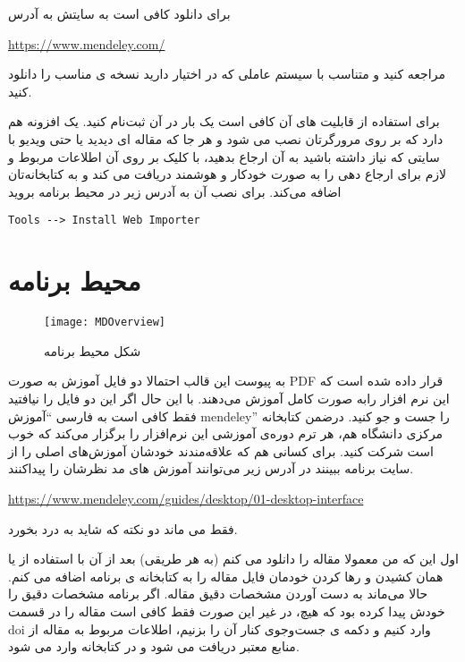 برای دانلود 
کافی است  به سایتش به آدرس 
\begin{latin}
	\url{https://www.mendeley.com/}
\end{latin}
مراجعه کنید و متناسب با سیستم عاملی که در اختیار دارید نسخه ی مناسب را دانلود کنید. 

برای استفاده از قابلیت های آن کافی است یک بار  در آن ثبت‌نام کنید.
یک افزونه هم دارد که بر روی مرورگرتان نصب می شود و هر جا که مقاله ای دیدید یا حتی ویدیو با سایتی که نیاز داشته باشید به آن ارجاع بدهید، با کلیک بر روی آن اطلاعات مربوط و لازم برای ارجاع دهی را به صورت خودکار و هوشمند دریافت می کند و به کتابخانه‌تان اضافه می‌کند.
برای نصب آن به آدرس زیر در محیط برنامه بروید 
\begin{latin}
	\begin{lstlisting}[style=Tex]
Tools --> Install Web Importer
	\end{lstlisting}
\end{latin}
\section{محیط برنامه }
\begin{figure}[h]
\centering
\texttt{[image: MDOverview]}
\caption{شکل محیط برنامه}
\label{fig:MDOverview}
\end{figure}
به پیوست این قالب احتمالا دو فایل آموزش به صورت PDF قرار داده شده است که این نرم افزار رابه صورت کامل آموزش می‌دهند. با این حال اگر این دو فایل را نیافتید فقط کافی است به فارسی ``آموزش mendeley'' را جست و جو کنید. درضمن کتابخانه مرکزی دانشگاه هم، هر ترم دوره‌ی آموزشی این نرم‌افزار را برگزار می‌کند که خوب است شرکت کنید.
برای کسانی هم که علاقه‌مندند خودشان آموزش‌های اصلی را از سایت برنامه ببینند در آدرس زیر می‌توانند آموزش های مد نظرشان را پیدا‌کنند.
\begin{latin}
	\url{https://www.mendeley.com/guides/desktop/01-desktop-interface}
\end{latin}

فقط می ماند دو نکته که شاید به درد بخورد.

اول این که من معمولا مقاله را دانلود می کنم (به هر طریقی) بعد از آن با استفاده از 
یا همان کشیدن و رها کردن خودمان فایل مقاله را به کتابخانه ی برنامه اضافه می کنم. حالا می‌ماند به دست آوردن مشخصات دقیق مقاله. اگر برنامه مشخصات دقیق را خودش پیدا کرده بود که هیچ، در غیر این صورت فقط کافی است 
مقاله را در قسمت 
doi
وارد کنیم و دکمه ی جست‌وجوی کنار آن را بزنیم، اطلاعات مربوط به مقاله از منابع معتبر دریافت می شود و در کتابخانه وارد می شود. 


